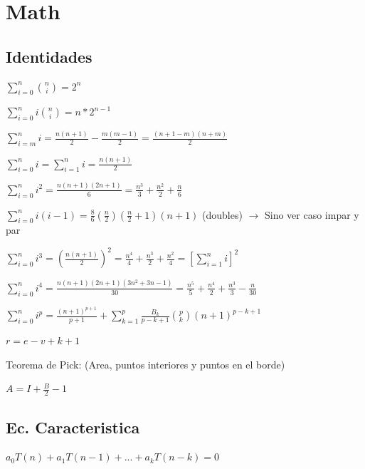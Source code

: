 

\section{Math}%
\subsection{Identidades}
{
$\sum_{i=0}^n\binom{n}{i}=2^n$

$\sum_{i=0}^n i\binom{n}{i}=n*2^{n-1}$

$\sum_{i=m}^n i = \frac{n(n+1)}{2} - \frac{m(m-1)}{2} = \frac{(n+1-m)(n+m)}{2}$

$\sum_{i=0}^n i = \sum_{i=1}^n i = \frac{n(n+1)}{2}$

$\sum_{i=0}^n i^2 = \frac{n(n+1)(2n+1)}{6} = \frac{n^3}{3} + \frac{n^2}{2} + \frac{n}{6}$

$\sum_{i=0}^n i(i-1) = \frac{8}{6}(\frac{n}{2})(\frac{n}{2}+1)(n+1)$ (doubles) $\rightarrow$ Sino ver caso impar y par

$\sum_{i=0}^n i^3 = \left(\frac{n(n+1)}{2}\right)^2 = \frac{n^4}{4} + \frac{n^3}{2} + \frac{n^2}{4} = \left[\sum_{i=1}^n i\right]^2$

$\sum_{i=0}^n i^4 = \frac{n(n+1)(2n+1)(3n^2+3n-1)}{30} = \frac{n^5}{5} + \frac{n^4}{2} + \frac{n^3}{3} - \frac{n}{30}$

$\sum_{i=0}^n i^p = \frac{(n+1)^{p+1}}{p+1} + \sum_{k=1}^p\frac{B_k}{p-k+1}{p\choose k}(n+1)^{p-k+1}$

$r=e-v+k+1$

Teorema de Pick: (Area, puntos interiores y puntos en el borde)

$A=I+\frac{B}{2}-1$


}%
\subsection{Ec. Caracteristica}
$a_0T(n)+a_1T(n-1)+...+a_kT(n-k)=0$

